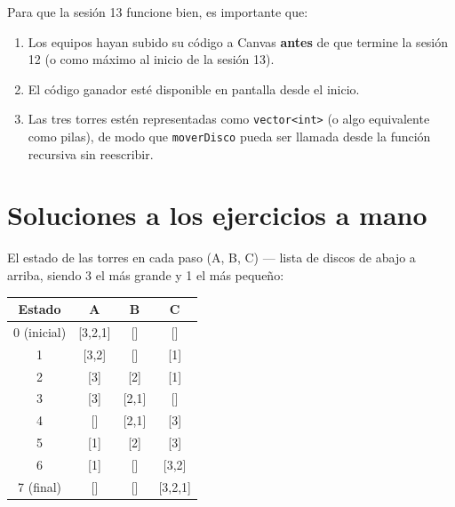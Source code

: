 \documentclass[12pt, oneside]{article}
\begin{document}
Para que la sesión 13 funcione bien, es importante que:

\begin{enumerate}
  \item Los equipos hayan subido su código a Canvas \textbf{antes} de
        que termine la sesión 12 (o como máximo al inicio de la sesión 13).
  \item El código ganador esté disponible en pantalla desde el inicio.
  \item Las tres torres estén representadas como \texttt{vector<int>}
        (o algo equivalente como pilas), de modo que \texttt{moverDisco}
        pueda ser llamada desde la función recursiva sin reescribir.
\end{enumerate}

\section{Soluciones a los ejercicios a mano}

\begin{notaprofesor}[Ejercicio 1 — 7 movimientos para $n=3$]
  El estado de las torres en cada paso (A, B, C) — lista de discos de
  abajo a arriba, siendo 3 el más grande y 1 el más pequeño:

  \begin{center}
  \begin{tabular}{cccc}
    \toprule
    \textbf{Estado} & \textbf{A} & \textbf{B} & \textbf{C} \\
    \midrule
    0 (inicial) & [3,2,1] & [] & [] \\
    1           & [3,2]   & [] & [1] \\
    2           & [3]     & [2] & [1] \\
    3           & [3]     & [2,1] & [] \\
    4           & []      & [2,1] & [3] \\
    5           & [1]     & [2] & [3] \\
    6           & [1]     & [] & [3,2] \\
    7 (final)   & []      & [] & [3,2,1] \\
    \bottomrule
  \end{tabular}
  \end{center}
\end{notaprofesor}
\end{document}
